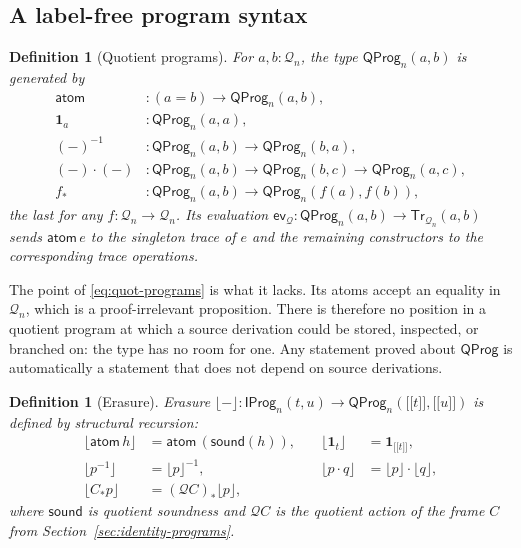 \documentclass[10pt,reqno]{amsart}
\newtheorem{definition}[theorem]{Definition}
\newcommand{\Tr}{\mathsf{Tr}}
\newcommand{\IProg}{\mathsf{IProg}}
\newcommand{\ev}{\mathsf{ev}}
\newcommand{\den}[1]{\mathopen{\lbrack\!\lbrack}#1\mathclose{\rbrack\!\rbrack}}
\newcommand{\Q}{\mathcal{Q}}
\begin{document}
\subsection{A label-free program syntax}

\begin{definition}[Quotient programs]
\label{def:quot-programs}
For \(a,b:\Q_n\), the type \(\mathsf{QProg}_n(a,b)\) is generated by
\[
\begin{aligned}
 \mathsf{atom} &: (a=b)\to\mathsf{QProg}_n(a,b), \\
 \mathbf 1_a &: \mathsf{QProg}_n(a,a), \\
 (-)^{-1} &: \mathsf{QProg}_n(a,b)\to\mathsf{QProg}_n(b,a), \\
 (-)\cdot(-) &: \mathsf{QProg}_n(a,b)\to\mathsf{QProg}_n(b,c)
   \to\mathsf{QProg}_n(a,c), \\
 f_{*} &: \mathsf{QProg}_n(a,b)\to\mathsf{QProg}_n(f(a),f(b)),
\end{aligned}
\tag{9.1}\label{eq:quot-programs}
\]
the last for any \(f:\Q_n\to\Q_n\).  Its evaluation
\(\ev_{\Q}:\mathsf{QProg}_n(a,b)\to\Tr_{\Q_n}(a,b)\) sends \(\mathsf{atom}\,e\)
to the singleton trace of \(e\) and the remaining constructors to the
corresponding trace operations.
\end{definition}

The point of \eqref{eq:quot-programs} is what it lacks.  Its atoms accept an
equality in \(\Q_n\), which is a proof-irrelevant proposition.  There is
therefore no position in a quotient program at which a source derivation could
be stored, inspected, or branched on: the type has no room for one.  Any
statement proved about \(\mathsf{QProg}\) is automatically a statement that
does not depend on source derivations.

\begin{definition}[Erasure]
\label{def:erasure}
Erasure \(\lfloor-\rfloor:\IProg_n(t,u)\to\mathsf{QProg}_n(\den t,\den u)\) is
defined by structural recursion:
\[
\begin{aligned}
 \lfloor\mathsf{atom}\,h\rfloor &=\mathsf{atom}\,(\mathsf{sound}(h)),
 &\quad
 \lfloor\mathbf 1_t\rfloor &=\mathbf 1_{\den t}, \\
 \lfloor p^{-1}\rfloor &=\lfloor p\rfloor^{-1},
 &\quad
 \lfloor p\cdot q\rfloor &=\lfloor p\rfloor\cdot\lfloor q\rfloor, \\
 \lfloor C_{*}p\rfloor &=(\Q C)_{*}\lfloor p\rfloor,
\end{aligned}
\tag{9.2}\label{eq:erasure-clauses}
\]
where \(\mathsf{sound}\) is quotient soundness and \(\Q C\) is the quotient
action of the frame \(C\) from Section~\ref{sec:identity-programs}.
\end{definition}
\end{document}
